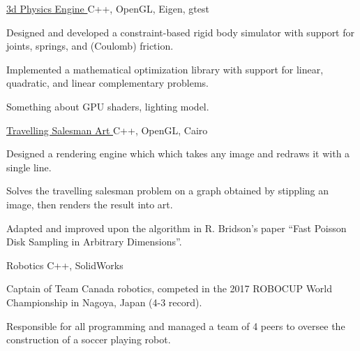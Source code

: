 

\begin{cventries}

  \cvprojectentry
    {\href{https://www.github.com/RileyJackson2000/fluffy-computing-machine}{{3d Physics Engine }\faGithubSquare\acvHeaderIconSep}} %
    {C++, OpenGL, Eigen, gtest} %
    {
      \begin{cvitems} %
      \item {Designed and developed a constraint-based rigid body simulator with support for joints, springs, and (Coulomb) friction.}
      \item {Implemented a mathematical optimization library with support for linear, quadratic, and linear complementary problems.}
      \item {Something about GPU shaders, lighting model.}
      \end{cvitems}
    }

  \cvprojectentry
    {\href{https://www.github.com/RileyJackson2000/tsp_art}{{Travelling Salesman Art }\faGithubSquare\acvHeaderIconSep}} %
    {C++, OpenGL, Cairo} %
    {
      \begin{cvitems} %
      \item {Designed a rendering engine which which takes any image and redraws it with a single line.}
      \item {Solves the travelling salesman problem on a graph obtained by stippling an image, then renders the result into art.}
      \item {Adapted and improved upon the algorithm in R. Bridson's paper ``Fast Poisson Disk Sampling in Arbitrary Dimensions''.}
      \end{cvitems}
    }

  \cvprojectentry
    {Robotics} %
    {C++, SolidWorks} %
    {
      \begin{cvitems} %
      \item {Captain of Team Canada robotics, competed in the 2017 ROBOCUP World Championship in Nagoya, Japan (4-3 record).}
      \item {Responsible for all programming and managed a team of 4 peers to oversee the construction of a soccer playing robot.}
      \end{cvitems}
    }


\end{cventries}
